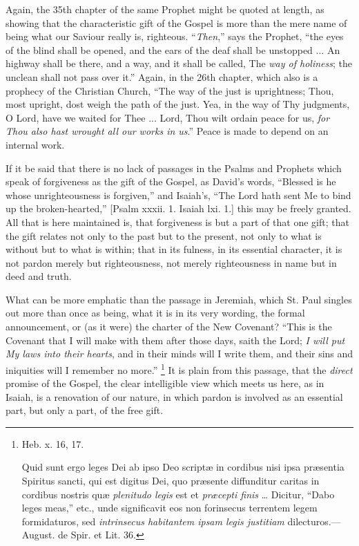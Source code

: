 Again, the 35th chapter of the same Prophet might be quoted at
length, as showing that the characteristic gift of the Gospel is more
than the mere name of being what our Saviour really is, righteous.
``\emph{Then},'' says the Prophet, ``the eyes of the blind
shall be opened, and the ears of the deaf shall be unstopped ... An
highway shall be there, and a way, and it shall be called, The \emph{way
of holiness}; the unclean shall not pass over it.'' Again, in
the 26th chapter, which also is a prophecy of the Christian Church,
``The way of the just is uprightness; Thou, most upright, dost
weigh the path of the just. Yea, in the way of Thy judgments, O Lord,
have we waited for Thee ... Lord, Thou wilt ordain peace for us, \emph{for
Thou also hast wrought all our works in us}.'' Peace is made to
depend on an internal work.

If it be said that there is no lack of passages in the Psalms and
Prophets which speak of forgiveness as the gift of the Gospel, as
David's words, ``Blessed is he whose unrighteousness is
forgiven,'' and Isaiah's, ``The Lord hath sent Me to bind up
the broken-hearted,'' [Psalm xxxii. 1. Isaiah lxi. 1.] this may be
freely granted. All that is here maintained is, that forgiveness
is but a part of that one gift; that the gift relates not only to the
past but to the present, not only to what is without but to what is
within; that in its fulness, in its essential character, it is not
pardon merely but righteousness, not merely righteousness in name but
in deed and truth.

What can be more emphatic than the passage in Jeremiah, which St.
Paul singles out more than once as being, what it is in its very
wording, the formal announcement, or (as it were) the charter of the
New Covenant? ``This is the Covenant that I will make with them
after those days, saith the Lord; \emph{I will put My laws into their
hearts}, and in their minds will I write them, and their sins and
iniquities will I remember no more.'' \footnote{Heb. x. 16, 17.

Quid sunt ergo leges Dei ab ipso Deo scriptæ in cordibus nisi ipsa
præsentia Spiritus sancti, qui est digitus Dei, quo præsente
diffunditur caritas in cordibus nostris quæ \emph{plenitudo legis}
est et \emph{præcepti finis} … Dicitur, ``Dabo leges meas,''
etc., unde significavit eos non forinsecus terrentem legem
formidaturos, sed \emph{intrinsecus habitantem ipsam legis justitiam}
dilecturos.—August. de Spir. et Lit. 36.} It is plain from this passage, that the \emph{direct} promise
of the Gospel, the clear intelligible view which meets us here, as in
Isaiah, is a renovation of our nature, in which pardon is involved as
an essential part, but only a part, of the free gift.

